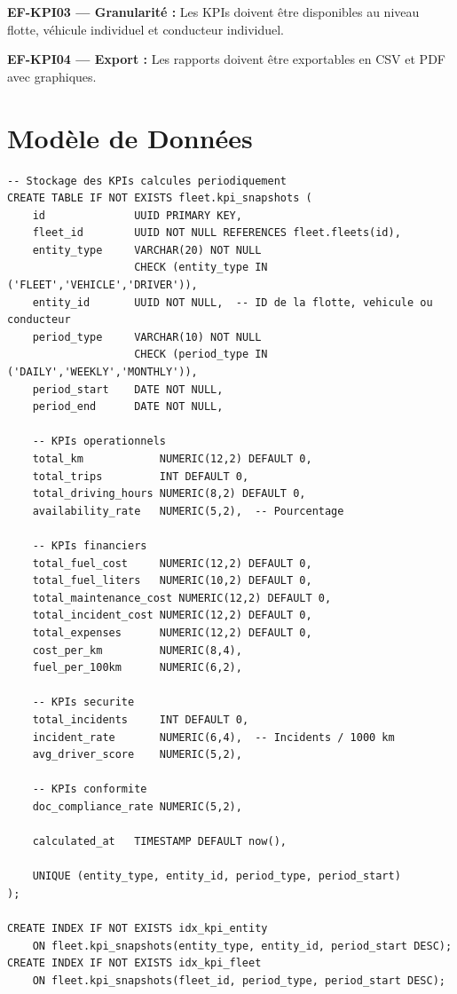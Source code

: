 \documentclass[12pt,a4paper]{report}
\begin{document}
\begin{reqbox}
\textbf{EF-KPI03 — Granularité :} Les KPIs doivent être disponibles au niveau flotte, véhicule individuel et conducteur individuel.
\end{reqbox}

\begin{reqbox}
\textbf{EF-KPI04 — Export :} Les rapports doivent être exportables en CSV et PDF avec graphiques.
\end{reqbox}

\section{Modèle de Données}

\begin{lstlisting}[style=sqlStyle, caption={Table des instantanés KPI}]
-- Stockage des KPIs calcules periodiquement
CREATE TABLE IF NOT EXISTS fleet.kpi_snapshots (
    id              UUID PRIMARY KEY,
    fleet_id        UUID NOT NULL REFERENCES fleet.fleets(id),
    entity_type     VARCHAR(20) NOT NULL
                    CHECK (entity_type IN ('FLEET','VEHICLE','DRIVER')),
    entity_id       UUID NOT NULL,  -- ID de la flotte, vehicule ou conducteur
    period_type     VARCHAR(10) NOT NULL
                    CHECK (period_type IN ('DAILY','WEEKLY','MONTHLY')),
    period_start    DATE NOT NULL,
    period_end      DATE NOT NULL,

    -- KPIs operationnels
    total_km            NUMERIC(12,2) DEFAULT 0,
    total_trips         INT DEFAULT 0,
    total_driving_hours NUMERIC(8,2) DEFAULT 0,
    availability_rate   NUMERIC(5,2),  -- Pourcentage

    -- KPIs financiers
    total_fuel_cost     NUMERIC(12,2) DEFAULT 0,
    total_fuel_liters   NUMERIC(10,2) DEFAULT 0,
    total_maintenance_cost NUMERIC(12,2) DEFAULT 0,
    total_incident_cost NUMERIC(12,2) DEFAULT 0,
    total_expenses      NUMERIC(12,2) DEFAULT 0,
    cost_per_km         NUMERIC(8,4),
    fuel_per_100km      NUMERIC(6,2),

    -- KPIs securite
    total_incidents     INT DEFAULT 0,
    incident_rate       NUMERIC(6,4),  -- Incidents / 1000 km
    avg_driver_score    NUMERIC(5,2),

    -- KPIs conformite
    doc_compliance_rate NUMERIC(5,2),

    calculated_at   TIMESTAMP DEFAULT now(),

    UNIQUE (entity_type, entity_id, period_type, period_start)
);

CREATE INDEX IF NOT EXISTS idx_kpi_entity
    ON fleet.kpi_snapshots(entity_type, entity_id, period_start DESC);
CREATE INDEX IF NOT EXISTS idx_kpi_fleet
    ON fleet.kpi_snapshots(fleet_id, period_type, period_start DESC);
\end{lstlisting}
\end{document}
